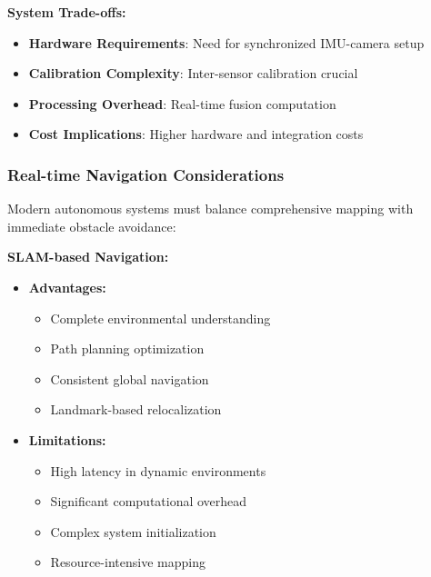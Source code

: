 \documentclass[12pt,oneside]{book}
\begin{document}
\textbf{System Trade-offs:}
\begin{itemize}
    \item \textbf{Hardware Requirements}: Need for synchronized IMU-camera setup
    \item \textbf{Calibration Complexity}: Inter-sensor calibration crucial
    \item \textbf{Processing Overhead}: Real-time fusion computation
    \item \textbf{Cost Implications}: Higher hardware and integration costs
\end{itemize}

\subsubsection{Real-time Navigation Considerations}
Modern autonomous systems must balance comprehensive mapping with immediate obstacle avoidance:

\textbf{SLAM-based Navigation:}
\begin{itemize}
    \item \textbf{Advantages:}
    \begin{itemize}
        \item Complete environmental understanding
        \item Path planning optimization
        \item Consistent global navigation
        \item Landmark-based relocalization
    \end{itemize}
    \item \textbf{Limitations:}
    \begin{itemize}
        \item High latency in dynamic environments
        \item Significant computational overhead
        \item Complex system initialization
        \item Resource-intensive mapping
    \end{itemize}
\end{itemize}
\end{document}
